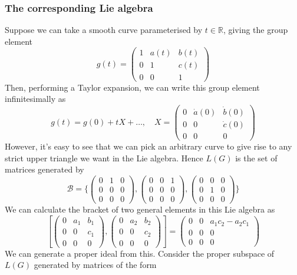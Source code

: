 \documentclass[11pt, oneside]{article}   	%
\theoremstyle{slanted}
\begin{document}
\subsubsection*{The corresponding Lie algebra} 
Suppose we can take a smooth curve parameterised by $ t \in \mathbb{ R} $, giving the group element 
\[ 
g ( t ) =  \begin{pmatrix} 1 & a( t ) & b( t )  \\ 0 & 1 & c( t )  \\ 0 & 0 & 1 \end{pmatrix}
\] Then, performing a Taylor expansion, we can write this group element infinitesimally as 
\[ 
g( t) = g( 0 )  + t X + \dots, \quad X = \begin{pmatrix} 0 & \dot{ a} ( 0 ) & \dot{b}( 0 )   \\ 0 & 0 & \dot{ c} ( 0 )   \\ 0 & 0 & 0 \end{pmatrix}
\] However, it's easy to see that we can pick an arbitrary curve to give rise to any strict upper triangle we want in the Lie algebra. Hence $L( G ) $ is the set of matrices generated by 
\[ 
 \mathcal{ B }  = \big \{ \begin{pmatrix} 0 & 1 & 0 \\ 0 & 0 & 0 \\ 0 & 0 & 0 \end{pmatrix}, \begin{pmatrix} 0 & 0 & 1 \\ 0 & 0 & 0 \\ 0 & 0 & 0 \end{pmatrix}, \begin{pmatrix} 0 & 0 & 0 \\ 0 & 1 & 0 \\ 0 & 0 & 0 \end{pmatrix} \big \} 
\]  We can calculate the bracket of two general elements in this Lie algebra as 
\[ 
 [ \begin{pmatrix} 0 & a_1 & b_1 \\ 0 & 0 & c_1 \\ 0 & 0 & 0 \end{pmatrix} , \begin{pmatrix} 0 & a_2 & b_2 \\ 0 & 0 & c_2 \\ 0 & 0 & 0 \end{pmatrix} ]   = \begin{pmatrix} 0 & 0 & a_1 c_2  - a_2 c_1 \\ 0 & 0 & 0 \\ 0 & 0 & 0 \end{pmatrix} 
\] We can generate a proper ideal from this. Consider the proper subspace of $ L ( G ) $  generated by matrices of the form 
\end{document}
